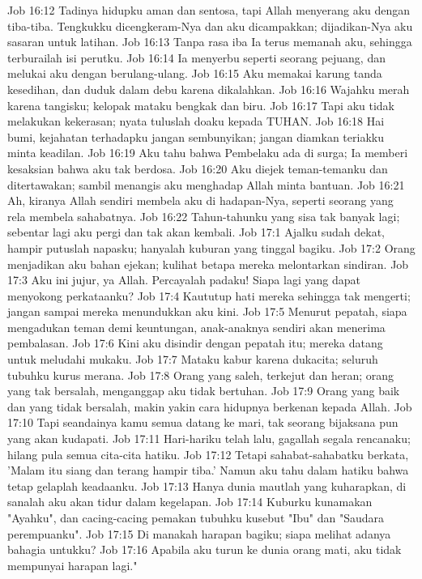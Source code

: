 Job 16:12  Tadinya hidupku aman dan sentosa, tapi Allah menyerang aku dengan tiba-tiba. Tengkukku dicengkeram-Nya dan aku dicampakkan; dijadikan-Nya aku sasaran untuk latihan.
Job 16:13  Tanpa rasa iba Ia terus memanah aku, sehingga terburailah isi perutku.
Job 16:14  Ia menyerbu seperti seorang pejuang, dan melukai aku dengan berulang-ulang.
Job 16:15  Aku memakai karung tanda kesedihan, dan duduk dalam debu karena dikalahkan.
Job 16:16  Wajahku merah karena tangisku; kelopak mataku bengkak dan biru.
Job 16:17  Tapi aku tidak melakukan kekerasan; nyata tuluslah doaku kepada TUHAN.
Job 16:18  Hai bumi, kejahatan terhadapku jangan sembunyikan; jangan diamkan teriakku minta keadilan.
Job 16:19  Aku tahu bahwa Pembelaku ada di surga; Ia memberi kesaksian bahwa aku tak berdosa.
Job 16:20  Aku diejek teman-temanku dan ditertawakan; sambil menangis aku menghadap Allah minta bantuan.
Job 16:21  Ah, kiranya Allah sendiri membela aku di hadapan-Nya, seperti seorang yang rela membela sahabatnya.
Job 16:22  Tahun-tahunku yang sisa tak banyak lagi; sebentar lagi aku pergi dan tak akan kembali.
Job 17:1  Ajalku sudah dekat, hampir putuslah napasku; hanyalah kuburan yang tinggal bagiku.
Job 17:2  Orang menjadikan aku bahan ejekan; kulihat betapa mereka melontarkan sindiran.
Job 17:3  Aku ini jujur, ya Allah. Percayalah padaku! Siapa lagi yang dapat menyokong perkataanku?
Job 17:4  Kaututup hati mereka sehingga tak mengerti; jangan sampai mereka menundukkan aku kini.
Job 17:5  Menurut pepatah, siapa mengadukan teman demi keuntungan, anak-anaknya sendiri akan menerima pembalasan.
Job 17:6  Kini aku disindir dengan pepatah itu; mereka datang untuk meludahi mukaku.
Job 17:7  Mataku kabur karena dukacita; seluruh tubuhku kurus merana.
Job 17:8  Orang yang saleh, terkejut dan heran; orang yang tak bersalah, menganggap aku tidak bertuhan.
Job 17:9  Orang yang baik dan yang tidak bersalah, makin yakin cara hidupnya berkenan kepada Allah.
Job 17:10  Tapi seandainya kamu semua datang ke mari, tak seorang bijaksana pun yang akan kudapati.
Job 17:11  Hari-hariku telah lalu, gagallah segala rencanaku; hilang pula semua cita-cita hatiku.
Job 17:12  Tetapi sahabat-sahabatku berkata, 'Malam itu siang dan terang hampir tiba.' Namun aku tahu dalam hatiku bahwa tetap gelaplah keadaanku.
Job 17:13  Hanya dunia mautlah yang kuharapkan, di sanalah aku akan tidur dalam kegelapan.
Job 17:14  Kuburku kunamakan "Ayahku", dan cacing-cacing pemakan tubuhku kusebut "Ibu" dan "Saudara perempuanku".
Job 17:15  Di manakah harapan bagiku; siapa melihat adanya bahagia untukku?
Job 17:16  Apabila aku turun ke dunia orang mati, aku tidak mempunyai harapan lagi."
